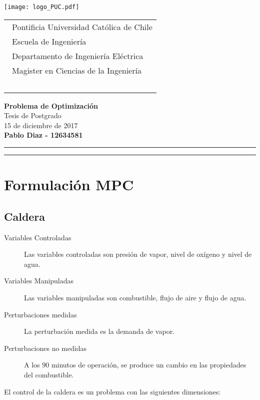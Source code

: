 \documentclass{article}
\begin{document}
\thispagestyle{empty}

\vspace*{-1cm}
\texttt{[image: logo\_PUC.pdf]}
\vspace*{-2cm}

\hspace*{2cm}
 \begin{tabular}{l}
  {\ Pontificia Universidad Católica de Chile}\\
  {\ Escuela de Ingeniería}\\
  {\ Departamento de Ingeniería Eléctrica}\\
  {\ Magister en Ciencias de la Ingeniería }\\
  {\  }\\
 \end{tabular}
 \hfill 
\vspace*{-0.2cm}
\begin{center}
{\Large\bf Problema de Optimización}\\
\vspace*{2mm}
{\Large Tesis de Postgrado}\\
{15 de diciembre de 2017}\\
\vspace*{1mm}
{\bf Pablo Diaz - 12634581 }\\
\vspace*{1mm}
\end{center}
\hrule\vspace*{2pt}\hrule
\setcounter{page}{1}

\section{Formulación MPC}
\subsection{Caldera}
\begin{description}
\item[Variables Controladas] Las variables controladas son presión de vapor, nivel de oxígeno y nivel de agua.
\item[Variables Manipuladas] Las variables manipuladas son combustible, flujo de aire y flujo de agua.
\item[Perturbaciones medidas] La perturbación medida es la demanda de vapor.
\item[Perturbaciones no medidas] A los 90 minutos de operación, se produce un cambio en las propiedades del combustible.

\end{description}
El control de la caldera es un problema con las siguientes dimensiones:
\end{document}
